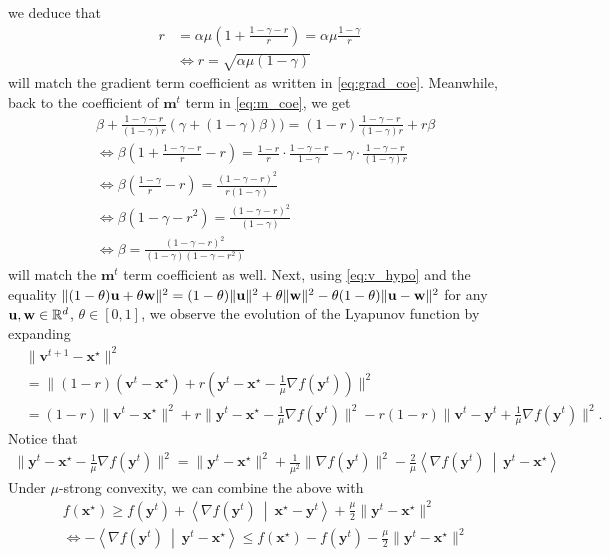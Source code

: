 \documentclass{article}
\theoremstyle{plain}
\theoremstyle{definition}
\theoremstyle{remark}
\def\bx{\mathbf{x}}
\def\by{\mathbf{y}}
\def\bm{\mathbf{m}}
\def\bv{\mathbf{v}}
\newcommand{\dotp}[2]{\left\langle{#1}\ \middle|\ {#2}\right\rangle}
\begin{document}
we deduce that
\begin{align}
    r &= \alpha \mu\left( 1+ \frac{1-\gamma -r}{r}\right) =\alpha \mu \frac{1-\gamma}{r} \\
    &\Leftrightarrow r = \sqrt{\alpha \mu (1-\gamma)} \label{eq:r_choice}
\end{align}
will match the gradient term coefficient as written in \eqref{eq:grad_coe}. Meanwhile, back to the coefficient of $\bm^t$ term in \eqref{eq:m_coe}, we get
\begin{align}
    &\beta + \frac{1-\gamma-r}{(1-\gamma) r} (\gamma + (1-\gamma) \beta)) = (1 - r) \frac{1-\gamma - r}{(1-\gamma)r} + r \beta \\
    &\Leftrightarrow \beta (1+ \frac{1-\gamma - r}{r} - r) = \frac{1-r}{r} \cdot \frac{1-\gamma - r}{1-\gamma} - \gamma \cdot \frac{1-\gamma -r}{(1-\gamma)r} \\
    &\Leftrightarrow \beta (\frac{1-\gamma }{r} - r) = \frac{(1-\gamma-r)^2}{r(1-\gamma)} \\
    &\Leftrightarrow \beta (1-\gamma - r^2) = \frac{(1-\gamma-r)^2}{(1-\gamma)} \\
    &\Leftrightarrow \beta  = \frac{(1-\gamma-r)^2}{(1-\gamma)(1-\gamma - r^2)} \label{eq:beta_choice}
\end{align}
will match the $\bm^t$ term coefficient as well. Next, using \eqref{eq:v_hypo} and the equality $\| (1-\theta) {\bf u} + \theta {\bf w} \|^2 = (1-\theta) \| {\bf u} \|^2 + \theta \| {\bf w} \|^2 - \theta (1-\theta) \| {\bf u} - {\bf w} \|^2$ for any ${\bf u, w} \in \mathbb{R}^d$, $\theta \in [0,1]$, we observe the evolution of the Lyapunov function by expanding
\begin{align}
    &\| \bv^{t+1} - \bx^\star \|^2 \\
    &= \| (1-r) (\bv^t-\bx^\star) + r (\by^t - \bx^\star - \frac{1}{\mu} \nabla f(\by^t)) \|^2 \\
    &=(1-r) \| \bv^t-\bx^\star \|^2 + r \| \by^t - \bx^\star - \frac{1}{\mu} \nabla f(\by^t)\|^2 - r(1-r) \| \bv^t - \by^t + \frac{1}{\mu} \nabla f(\by^t) \|^2. \label{eq:vx_1}
\end{align}
Notice that
\begin{align}
    \| \by^t - \bx^\star - \frac{1}{\mu} \nabla f(\by^t)\|^2 = \| \by^t - \bx^\star\|^2 + \frac{1}{\mu^2} \|\nabla f(\by^t) \|^2 -\frac{2}{\mu} \dotp{\nabla f(\by^t)}{\by^t - \bx^\star}
\end{align}
Under $\mu$-strong convexity, we can combine the above with
\begin{align}
    &f(\bx^\star) \ge  f(\by^t) + \dotp{\nabla f(\by^t)}{\bx^\star - \by^t}  + \frac{\mu}{2} \|\by^t - \bx^\star \|^2 \\
    &\Leftrightarrow - \dotp{\nabla f(\by^t)}{\by^t - \bx^\star} \leq f(\bx^\star) - f(\by^t) - \frac{\mu}{2} \| \by^t - \bx^\star \|^2
\end{align}
\end{document}
